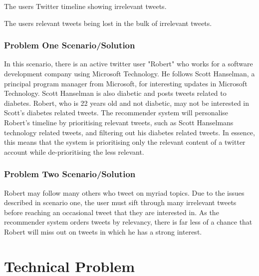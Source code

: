 \documentclass{article}
\begin{document}
\begin{itemize*}
	 \item The users Twitter timeline showing irrelevant tweets.
	 \item The users relevant tweets being lost in the bulk of irrelevant tweets.
\end{itemize*}

\subsubsection*{Problem One Scenario/Solution}
In this scenario, there is an active twitter user "Robert" who works for a software development company using Microsoft Technology. He follows Scott Hanselman, a principal program manager from Microsoft, for interesting updates in Microsoft Technology. Scott Hanselman is also diabetic and posts tweets related to diabetes. Robert, who is 22 years old and not diabetic, may not be interested in Scott's diabetes related tweets. The recommender system will personalise Robert's timeline by prioritising relevant tweets, such as Scott Hanselmans technology related tweets, and filtering out his diabetes related tweets. In essence, this means that the system is prioritising only the relevant content of a twitter account while de-prioritising the less relevant.

\subsubsection*{Problem Two Scenario/Solution}
Robert may follow many others who tweet on myriad topics. Due to the issues described in scenario one, the user must sift through many irrelevant tweets before reaching an occasional tweet that they are interested in. As the recommender system orders tweets by relevancy, there is far less of a chance that Robert will miss out on tweets in which he has a strong interest.


\section{Technical Problem}
%
%
%
\end{document}
